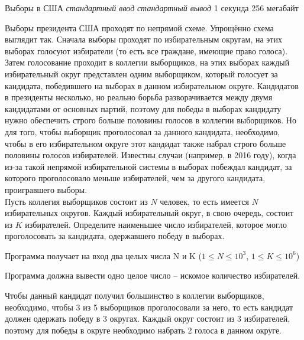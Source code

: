 \begin{problem}%
{Выборы в США}%
{\textsl{стандартный ввод}}%
{\textsl{стандартный вывод}}%
{1 секунда}%
{256 мегабайт}{}

Выборы президента США проходят по непрямой схеме. Упрощённо схема выглядит так. Сначала выборы проходят по избирательным округам, на этих выборах голосуют избиратели (то есть все граждане, имеющие право голоса). Затем голосование проходит в коллегии выборщиков, на этих выборах каждый избирательный округ представлен одним выборщиком, который голосует за кандидата, победившего на выборах в данном избирательном округе. Кандидатов в президенты несколько, но реально борьба разворачивается между двумя кандидатами от основных партий, поэтому для победы в выборах кандидату нужно обеспечить строго больше половины голосов в коллегии выборщиков. Но для того, чтобы выборщик проголосовал за данного кандидата, необходимо, чтобы в его избирательном округе этот кандидат также набрал строго больше половины голосов избирателей. Известны случаи (например, в 2016 году), когда из-за такой непрямой избирательной системы в выборах побеждал кандидат, за которого проголосовало меньше избирателей, чем за другого кандидата, проигравшего выборы.\\

Пусть коллегия выборщиков состоит из $N$ человек, то есть имеется $N$ избирательных округов. Каждый избирательный округ, в свою очередь, состоит из $K$ избирателей. Определите наименьшее число избирателей, которое могло проголосовать за кандидата, одержавшего победу в выборах.

\InputFile

Программа получает на вход два целых числа N и K ($1 \le N \le 10^3$, $1 \le K \le 10^6$)

\OutputFile

Программа должна вывести одно целое число – искомое количество избирателей.

\Examples

\begin{example}
%
\end{example}

\Explanation

Чтобы данный кандидат получил большинство в коллегии выборщиков, необходимо, чтобы 3 из 5 выборщиков проголосовали за него, то есть кандидат должен одержать победу в 3 округах. Каждый округ состоит из 3 избирателей, поэтому для победы в округе необходимо набрать 2 голоса в данном округе.

\end{problem}
